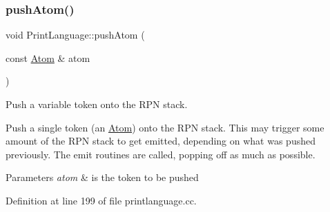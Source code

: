 \subsubsection{\texorpdfstring{pushAtom()}{pushAtom()}}
{\footnotesize\ttfamily void Print\+Language\+::push\+Atom (\begin{DoxyParamCaption}\item[{const \mbox{\hyperlink{struct_print_language_1_1_atom}{Atom}} \&}]{atom }\end{DoxyParamCaption})\hspace{0.3cm}{\ttfamily [protected]}}



Push a variable token onto the R\+PN stack. 

Push a single token (an \mbox{\hyperlink{struct_print_language_1_1_atom}{Atom}}) onto the R\+PN stack. This may trigger some amount of the R\+PN stack to get emitted, depending on what was pushed previously. The \textquotesingle{}emit\textquotesingle{} routines are called, popping off as much as possible. 
\begin{DoxyParams}{Parameters}
{\em atom} & is the token to be pushed \\
\hline
\end{DoxyParams}


Definition at line 199 of file printlanguage.\+cc.

